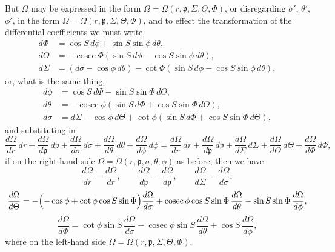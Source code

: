 \documentclass[11pt]{article}
\begin{document}
\medskip
\noindent But $\Omega$ may be expressed in the form $\Omega = \Omega(r,\mathfrak{p},\Sigma,\Theta,\Phi)$, or disregarding $\sigma'$, $\theta'$, $\phi'$, in the form $\Omega = \Omega(r,\mathfrak{p},\Sigma,\Theta,\Phi)$, and to effect the transformation of the differential coefficients we must write,
\begin{align*}
d\Phi &= \cos S\,d\phi + \sin S\sin\phi\,d\theta, \\
d\Theta &= -\operatorname{cosec}\Phi(\sin S\,d\phi - \cos S\sin\phi\,d\theta), \\
d\Sigma &= (d\sigma - \cos\phi\,d\theta) - \cot\Phi(\sin S\,d\phi - \cos S\sin\phi\,d\theta),
\end{align*}
or, what is the same thing,
\begin{align*}
d\phi &= \cos S\,d\Phi - \sin S\sin\Phi\,d\Theta, \\
d\theta &= -\operatorname{cosec}\phi(\sin S\,d\Phi + \cos S\sin\Phi\,d\Theta), \\
d\sigma &= d\Sigma - \cos\phi\,d\Theta + \cot\phi(\sin S\,d\Phi + \cos S\sin\Phi\,d\Theta),
\end{align*}
and substituting in
\[
\frac{d\Omega}{dr}\,dr + \frac{d\Omega}{d\mathfrak{p}}\,d\mathfrak{p} + \frac{d\Omega}{d\sigma}\,d\sigma + \frac{d\Omega}{d\theta}\,d\theta + \frac{d\Omega}{d\phi}\,d\phi
= \frac{d\Omega}{dr}\,dr + \frac{d\Omega}{d\mathfrak{p}}\,d\mathfrak{p} + \frac{d\Omega}{d\Sigma}\,d\Sigma + \frac{d\Omega}{d\Theta}\,d\Theta + \frac{d\Omega}{d\Phi}\,d\Phi,
\]
if on the right-hand side $\Omega = \Omega(r,\mathfrak{p},\sigma,\theta,\phi)$ as before, then we have
\[
\frac{d\Omega}{dr} = \frac{d\Omega}{dr},\qquad \frac{d\Omega}{d\mathfrak{p}} = \frac{d\Omega}{d\mathfrak{p}},\qquad \frac{d\Omega}{d\Sigma} = \frac{d\Omega}{d\sigma},
\]
\[
\frac{d\Omega}{d\Theta} = -\Bigl(-\cos\phi + \cot\phi\cos S\sin\Phi\Bigr)\frac{d\Omega}{d\sigma} + \operatorname{cosec}\phi\cos S\sin\Phi\,\frac{d\Omega}{d\theta} - \sin S\sin\Phi\,\frac{d\Omega}{d\phi},
\]
\[
\frac{d\Omega}{d\Phi} = \cot\phi\sin S\,\frac{d\Omega}{d\sigma} - \operatorname{cosec}\phi\sin S\,\frac{d\Omega}{d\theta} + \cos S\,\frac{d\Omega}{d\phi},
\]
where on the left-hand side $\Omega = \Omega(r,\mathfrak{p},\Sigma,\Theta,\Phi)$.
\end{document}

